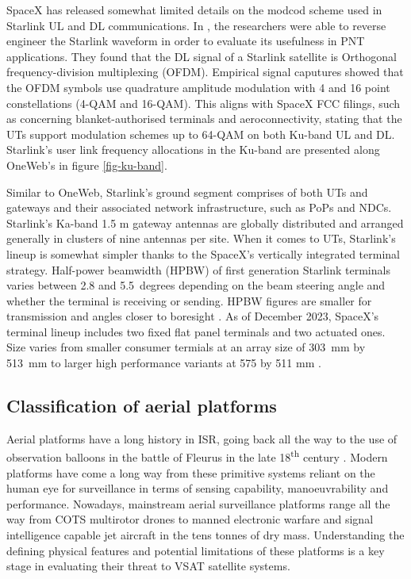 \documentclass[english, 12pt, a4paper, elec, utf8, a-1b, online]{aaltothesis}
\begin{document}
SpaceX has released somewhat limited details on the modcod scheme used in Starlink UL and DL communications. In \cite{humphreys2023signal}, the researchers were able to reverse engineer the Starlink waveform in order to evaluate its usefulness in PNT applications. They found that the DL signal of a Starlink satellite is Orthogonal frequency-division multiplexing (OFDM). Empirical signal caputures showed that the OFDM symbols use quadrature amplitude modulation with 4 and 16 point constellations (4-QAM and 16-QAM). This aligns with SpaceX FCC filings, such as \cite{SpaceX-SES-AMD-20210731-01295} concerning blanket-authorised terminals and aeroconnectivity, stating that the UTs support modulation schemes up to 64-QAM on both Ku-band UL and DL.
Starlink's user link frequency allocations in the Ku-band are presented along OneWeb's in figure \ref{fig-ku-band}.

Similar to OneWeb, Starlink's ground segment comprises of both UTs and gateways and their associated network infrastructure, such as PoPs and NDCs. Starlink's Ka-band 1.5 m gateway antennas are globally distributed and arranged generally in clusters of nine antennas per site.
When it comes to UTs, Starlink's lineup is somewhat simpler thanks to the SpaceX's vertically integrated terminal strategy.
Half-power beamwidth (HPBW) of first generation Starlink terminals varies between 2.8 and 5.5~degrees depending on the beam steering angle and whether the terminal is receiving or sending. HPBW figures are smaller for transmission and angles closer to boresight \cite{SpaceX-SES-AMD-20210731-01295}. As of December 2023, SpaceX's terminal lineup includes two fixed flat panel terminals and two actuated ones. Size varies from smaller consumer termials at an array size of \qty{303}{\milli\meter} by \qty{513}{\milli\meter} to larger high performance variants at 575 by 511 mm \cite{starlink-terminal-specs}.

\subsection{Classification of aerial platforms} \label{ch-aerial-platforms}

Aerial platforms have a long history in ISR, going back all the way to the use of observation balloons in the battle of Fleurus in the late 18\textsuperscript{th} century \cite{centennial-balloons-fleurus}.
Modern platforms have come a long way from these primitive systems reliant on the human eye for surveillance in terms of sensing capability, manoeuvrability and performance.
Nowadays, mainstream aerial surveillance platforms range all the way from COTS multirotor drones to manned electronic warfare and signal intelligence capable jet aircraft in the tens tonnes of dry mass.
Understanding the defining physical features and potential limitations of these platforms is a key stage in evaluating their threat to VSAT satellite systems.
\end{document}

